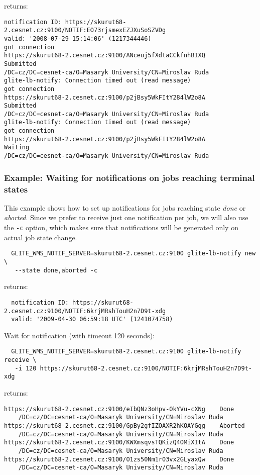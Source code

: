 returns:

\begin{verbatim}
notification ID: https://skurut68-2.cesnet.cz:9100/NOTIF:EO73rjsmexEZJXuSoSZVDg
valid: '2008-07-29 15:14:06' (1217344446)
got connection
https://skurut68-2.cesnet.cz:9100/ANceuj5fXdtaCCkfnhBIXQ        Submitted
/DC=cz/DC=cesnet-ca/O=Masaryk University/CN=Miroslav Ruda
glite-lb-notify: Connection timed out (read message)
got connection
https://skurut68-2.cesnet.cz:9100/p2jBsy5WkFItY284lW2o8A        Submitted
/DC=cz/DC=cesnet-ca/O=Masaryk University/CN=Miroslav Ruda
glite-lb-notify: Connection timed out (read message)
got connection
https://skurut68-2.cesnet.cz:9100/p2jBsy5WkFItY284lW2o8A        Waiting
/DC=cz/DC=cesnet-ca/O=Masaryk University/CN=Miroslav Ruda
\end{verbatim}


\subsubsection{Example: Waiting for notifications on jobs reaching terminal states}

This example shows how to set up notifications for jobs reaching state \emph{done} or \emph {aborted}. Since we prefer to receive just one notification per job, we will also use the \texttt{-c} option, which makes sure that notifications will be generated only on actual job state change.


\begin{verbatim}
  GLITE_WMS_NOTIF_SERVER=skurut68-2.cesnet.cz:9100 glite-lb-notify new \
   --state done,aborted -c
\end{verbatim}

returns:

\begin{verbatim}
  notification ID: https://skurut68-2.cesnet.cz:9100/NOTIF:6krjMRshTouH2n7D9t-xdg 
  valid: '2009-04-30 06:59:18 UTC' (1241074758)	
\end{verbatim}

Wait for notification (with timeout 120 seconds):
\begin{verbatim}
  GLITE_WMS_NOTIF_SERVER=skurut68-2.cesnet.cz:9100 glite-lb-notify receive \
   -i 120 https://skurut68-2.cesnet.cz:9100/NOTIF:6krjMRshTouH2n7D9t-xdg 
\end{verbatim}

returns:
\begin{verbatim}
https://skurut68-2.cesnet.cz:9100/eIbQNz3oHpv-OkYVu-cXNg	Done
    /DC=cz/DC=cesnet-ca/O=Masaryk University/CN=Miroslav Ruda
https://skurut68-2.cesnet.cz:9100/GpBy2gfIZOAXR2hKOAYGgg	Aborted
    /DC=cz/DC=cesnet-ca/O=Masaryk University/CN=Miroslav Ruda
https://skurut68-2.cesnet.cz:9100/KWXmsqvsTQKizQ4OMiXItA	Done
    /DC=cz/DC=cesnet-ca/O=Masaryk University/CN=Miroslav Ruda
https://skurut68-2.cesnet.cz:9100/O1zs50Nm1r03vx2GLyaxQw	Done
    /DC=cz/DC=cesnet-ca/O=Masaryk University/CN=Miroslav Ruda
\end{verbatim}

